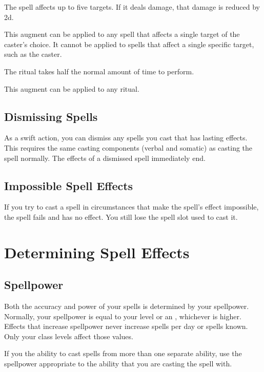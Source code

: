              The spell affects up to five targets.
            If it deals damage, that damage is reduced by \minus2d.
            \par This augment can be applied to any spell that affects a single target of the caster's choice.
            It cannot be applied to spells that affect a single specific target, such as the caster.

             The ritual takes half the normal amount of time to perform.
            \par This augment can be applied to any ritual.

    \subsection{Dismissing Spells}

        As a swift action, you can dismiss any spells you cast that has lasting effects.
        This requires the same casting components (verbal and somatic) as casting the spell normally.
        The effects of a dismissed spell immediately end.

    \subsection{Impossible Spell Effects}
        If you try to cast a spell in circumstances that make the spell's effect impossible, the spell fails and has no effect.
        You still lose the spell slot used to cast it.

\section{Determining Spell Effects}

    \subsection{Spellpower}

        Both the accuracy and power of your spells is determined by your spellpower.
        Normally, your spellpower is equal to your level or an , whichever is higher.
        Effects that increase spellpower never increase spells per day or spells known.
        Only your class levels affect those values.

         If you the ability to cast spells from more than one separate ability, use the spellpower appropriate to the ability that you are casting the spell with.


